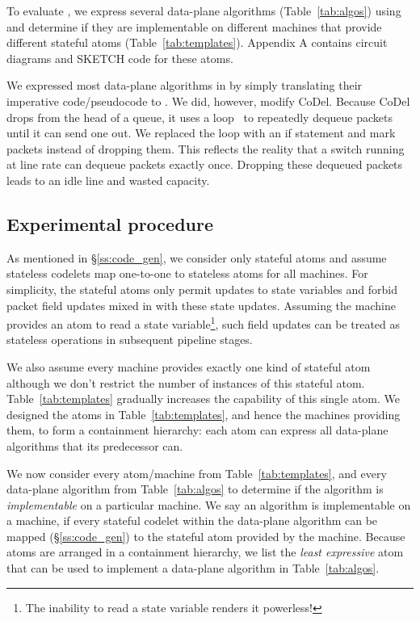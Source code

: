 To evaluate \pktlanguage, we express several data-plane algorithms
(Table~\ref{tab:algos}) using \pktlanguage and determine if they are
implementable on different \absmachine machines that provide different stateful
atoms (Table~\ref{tab:templates}). Appendix A contains circuit diagrams and
SKETCH code for these atoms.

We expressed most data-plane algorithms in \pktlanguage by simply translating
their imperative code/pseudocode to \pktlanguage. We did, however, modify
CoDel. Because CoDel drops from the head of a queue, it uses a
loop~\cite{codel_code} to repeatedly dequeue packets until it can send one out.
We replaced the loop with an if statement and mark packets instead of dropping
them. This reflects the reality that a switch running at line rate can dequeue
packets exactly once. Dropping these dequeued packets leads to an idle line and
wasted capacity.

\subsection{Experimental procedure}
As mentioned in \S\ref{ss:code_gen}, we consider only stateful atoms and assume
stateless codelets map one-to-one to stateless atoms for all \absmachine
machines. For simplicity, the stateful atoms only permit updates to state
variables and forbid packet field updates mixed in with these state updates.
Assuming the \absmachine machine provides an atom to read a state
variable\footnote{The inability to read a state variable renders it
powerless!}, such field updates can be treated as stateless operations in
subsequent pipeline stages.

We also assume every \absmachine machine provides exactly one kind of stateful
atom although we don't restrict the number of instances of this stateful atom.
Table~\ref{tab:templates} gradually increases the capability of this single
atom.  We designed the atoms in Table~\ref{tab:templates}, and hence the
\absmachine machines providing them, to form a containment hierarchy: each atom
can express all data-plane algorithms that its predecessor can.

We now consider every atom/\absmachine machine from Table~\ref{tab:templates},
and every data-plane algorithm from Table~\ref{tab:algos} to determine if the
algorithm is \textit{implementable} on a particular \absmachine machine. We say
an algorithm is implementable on a \absmachine machine, if every stateful
codelet within the data-plane algorithm can be mapped (\S\ref{ss:code_gen}) to
the stateful atom provided by the \absmachine machine. Because atoms are
arranged in a containment hierarchy, we list the \textit{least expressive} atom
that can be used to implement a data-plane algorithm in Table~\ref{tab:algos}.

